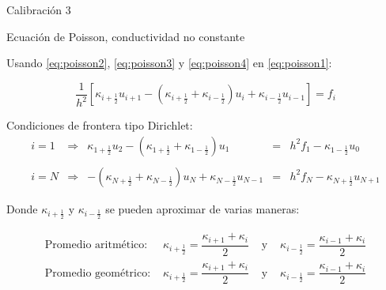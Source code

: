 \documentclass{beamer}
\begin{document}
\begin{frame}{Calibración 3}

\begin{exampleblock}{Ecuación de Poisson, conductividad no constante}
{\footnotesize 

Usando \eqref{eq:poisson2}, \eqref{eq:poisson3} y \eqref{eq:poisson4} en \eqref{eq:poisson1}:

\begin{equation}
\dfrac{1}{h^2} \left[
\kappa_{i+\frac{1}{2}} u_{i+1} - 
(\kappa_{i+\frac{1}{2}} + \kappa_{i-\frac{1}{2}}) u_{i} +
\kappa_{i-\frac{1}{2}} u_{i-1}
\right] = f_i
\end{equation}

Condiciones de frontera tipo Dirichlet: 
%
\[
\begin{array}{ccccc}
i = 1 & \Longrightarrow &
\kappa_{1+\frac{1}{2}} u_{2} - 
(\kappa_{1+\frac{1}{2}} + \kappa_{1-\frac{1}{2}}) u_{1} & = & h^2 f_1 - \kappa_{1-\frac{1}{2}} u_{0} \\ \\
i = N & \Longrightarrow &
- (\kappa_{N+\frac{1}{2}} + \kappa_{N-\frac{1}{2}}) u_{N} +
\kappa_{N-\frac{1}{2}} u_{N-1} & = & h^2 f_N - \kappa_{N+\frac{1}{2}} u_{N+1}
\end{array}
\]

\noindent
Donde $\kappa_{i+\frac{1}{2}}$ y $\kappa_{i-\frac{1}{2}}$ se pueden aproximar de varias maneras:

\[
\begin{array}{cccc}
\text{Promedio aritmético: } &
\kappa_{i+\frac{1}{2}} = \dfrac{ \kappa_{i+1} + \kappa_{i}}{2} & \text{ y } &
\kappa_{i-\frac{1}{2}} = \dfrac{ \kappa_{i-1} + \kappa_{i}}{2} \\
\text{Promedio geométrico: } &
\kappa_{i+\frac{1}{2}} = \dfrac{ \kappa_{i+1} + \kappa_{i}}{2} & \text{ y } &
\kappa_{i-\frac{1}{2}} = \dfrac{ \kappa_{i-1} + \kappa_{i}}{2} 
\end{array}
\]

}
\end{exampleblock}

\end{frame}
\end{document}
